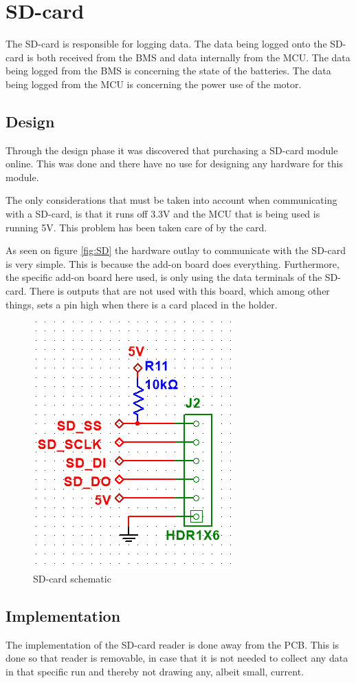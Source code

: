 \newpage
\section{SD-card}
The SD-card is responsible for logging data. The data being logged onto the SD-card is both received from the BMS and data internally from the MCU. The data being logged from the BMS is concerning the state of the batteries. The data being logged from the MCU is concerning the power use of the motor.

\subsection{Design}
Through the design phase it was discovered that purchasing a SD-card module online. This was done and there have no use for designing any hardware for this module. 

The only considerations that must be taken into account when communicating with a SD-card, is that it runs off 3.3V and the MCU that is being used is running 5V. This problem has been taken care of by the card.

As seen on figure \vref{fig:SD} the hardware outlay to communicate with the SD-card is very simple. This is because the add-on board does everything. Furthermore, the specific add-on board here used, is only using the data terminals of the SD-card. There is outputs that are not used with this board, which among other things, sets a pin high when there is a card placed in the holder. 

\begin{figure}[H]
	\centering
	\includegraphics[width=0.4\linewidth]{Hardware/Pictures/SD_card}
	\caption{SD-card schematic}
	\label{fig:SD}
\end{figure}

\subsection{Implementation}
The implementation of the SD-card reader is done away from the PCB. This is done so that reader is removable, in case that it is not needed to collect any data in that specific run and thereby not drawing any, albeit small, current.  

